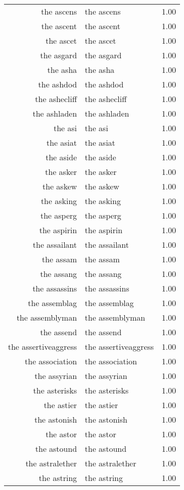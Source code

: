 \begin{table}[ht]
\begin{tabular}{rlr}
  the ascens & the ascens & 1.00 \\ 
  the ascent & the ascent & 1.00 \\ 
  the ascet & the ascet & 1.00 \\ 
  the asgard & the asgard & 1.00 \\ 
  the asha & the asha & 1.00 \\ 
  the ashdod & the ashdod & 1.00 \\ 
  the ashecliff & the ashecliff & 1.00 \\ 
  the ashladen & the ashladen & 1.00 \\ 
  the asi & the asi & 1.00 \\ 
  the asiat & the asiat & 1.00 \\ 
  the aside & the aside & 1.00 \\ 
  the asker & the asker & 1.00 \\ 
  the askew & the askew & 1.00 \\ 
  the asking & the asking & 1.00 \\ 
  the asperg & the asperg & 1.00 \\ 
  the aspirin & the aspirin & 1.00 \\ 
  the assailant & the assailant & 1.00 \\ 
  the assam & the assam & 1.00 \\ 
  the assang & the assang & 1.00 \\ 
  the assassins & the assassins & 1.00 \\ 
  the assemblag & the assemblag & 1.00 \\ 
  the assemblyman & the assemblyman & 1.00 \\ 
  the assend & the assend & 1.00 \\ 
  the assertiveaggress & the assertiveaggress & 1.00 \\ 
  the association & the association & 1.00 \\ 
  the assyrian & the assyrian & 1.00 \\ 
  the asterisks & the asterisks & 1.00 \\ 
  the astier & the astier & 1.00 \\ 
  the astonish & the astonish & 1.00 \\ 
  the astor & the astor & 1.00 \\ 
  the astound & the astound & 1.00 \\ 
  the astralether & the astralether & 1.00 \\ 
  the astring & the astring & 1.00 \\ 

\end{tabular}
\end{table}
